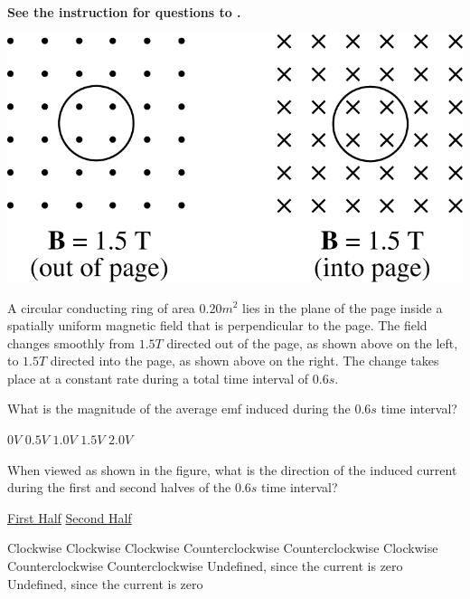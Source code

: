 \textbf{See the instruction for questions  to .}

\begin{center}
\includegraphics[scale=0.25]{images/img-012-025.png}
\end{center}

A circular conducting ring of area $0.20 \unit{m^2}$ lies in the plane of the page inside a spatially uniform magnetic field that is perpendicular to the page. The field changes smoothly from $1.5 \unit{T}$ directed out of the page, as shown above on the left, to $1.5 \unit{T}$ directed into the page, as shown above on the right. The change takes place at a constant rate during a total time interval of $0.6 \unit{s}$.

\begin{questions}\setcounter{question}{25}\question
What is the magnitude of the average emf induced during the $0.6 \unit{s}$ time interval?

\begin{oneparchoices}
\choice $0 \unit{V}$
\choice $0.5 \unit{V}$
\choice $1.0 \unit{V}$
\choice $1.5 \unit{V}$
\choice $2.0 \unit{V}$
\end{oneparchoices}\end{questions}

\begin{questions}\setcounter{question}{26}\question
When viewed as shown in the figure, what is the direction of the induced current during the first and second halves of the $0.6 \unit{s}$ time interval?

\tabto{0.75cm}\underline{First Half}
\tabto{8.00cm}\underline{Second Half}

\begin{choices}
\choice Clockwise                            \tabto{7.25cm} Clockwise
\choice Clockwise                            \tabto{7.25cm} Counterclockwise
\choice Counterclockwise                     \tabto{7.25cm} Clockwise
\choice Counterclockwise                     \tabto{7.25cm} Counterclockwise
\choice Undefined, since the current is zero \tabto{7.25cm} Undefined, since the current is zero
\end{choices}\end{questions}

